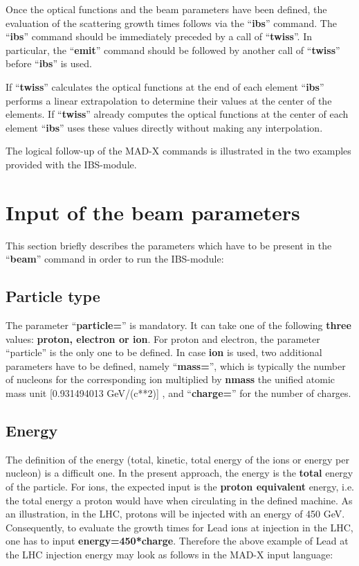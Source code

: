 Once the optical functions and the beam parameters have been defined,
the evaluation of the scattering growth times follows via the
``\textbf{ibs}'' command.  The ``\textbf{ibs}'' command should be
immediately preceded by a call of ``\textbf{twiss}''. In particular, the
``\textbf{emit}'' command should be followed by another call of
``\textbf{twiss}'' before ``\textbf{ibs}'' is used.      

If ``\textbf{twiss}'' calculates the optical functions at the end of
each element ``\textbf{ibs}'' performs a linear extrapolation to
determine their values  at the center of the elements. If
``\textbf{twiss}'' already computes the optical functions at the center
of each element ``\textbf{ibs}'' uses these  values directly without
making any interpolation.   

The logical follow-up of the MAD-X commands is illustrated in the two
examples provided with the IBS-module. 
  
\section{Input of the beam parameters}
This section briefly describes the parameters which have to be present
in the  ``\textbf{beam}'' command in order to run the IBS-module:  

\subsection{Particle type}
The parameter ``\textbf{particle=}'' is mandatory. It can take one of
the following \textbf{three} values: \textbf{proton, electron or
  ion}. For proton and electron, the parameter ``particle'' is the only
one to be defined. In case \textbf{ion} is used, two additional
parameters have to be defined, namely ``\textbf{mass=}'', which is
typically the number of nucleons for the corresponding ion multiplied by
\textbf{nmass} the unified atomic mass unit [0.931494013 GeV/(c**2)] ,
and ``\textbf{charge=}'' for the number of charges.   

\subsection{Energy}
The definition of the energy (total, kinetic, total energy of the ions
or energy per nucleon) is a difficult one. In the present approach, the
energy is the \textbf{total} energy of the particle. For ions, the
expected input is the \textbf{proton equivalent} energy, i.e. the total
energy a proton would have when circulating in the defined machine. As
an illustration, in the LHC, protons will be injected with an energy of
450 GeV. Consequently, to evaluate the growth times for Lead ions at
injection in the LHC, one has to input
\textbf{energy=450*charge}. Therefore the above example of Lead at the
LHC injection energy may look as follows in the MAD-X input language:  

